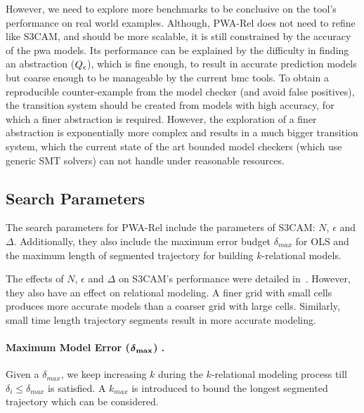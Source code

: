 However, we need to explore more benchmarks to be conclusive on the
tool's performance on real world examples. Although, PWA-Rel does not
need to refine like S3CAM, and should be more scalable, it is still
constrained by the accuracy of the pwa models. Its performance can be
explained by the difficulty in finding an abstraction
($Q_\epsilon$), which is fine enough, to result in accurate
prediction models but coarse enough to be manageable by the current
bmc tools.  To obtain a reproducible counter-example from the model
checker (and avoid false positives), the transition system should be
created from models with high accuracy, for which a finer abstraction
is required.  However, the exploration of a finer abstraction is
exponentially more complex and results in a much bigger transition
system, which the current state of the art bounded model checkers
(which use generic SMT solvers) can not handle under reasonable
resources.

\subsection{Search Parameters}

The search parameters for PWA-Rel include the parameters of S3CAM:
$N$, $\epsilon$ and $\Delta$. Additionally, they also include the
maximum error budget $\delta_{max}$ for OLS and the maximum length of
segmented trajectory for building $k$-relational models.

The effects of $N$, $\epsilon$ and $\Delta$
on S3CAM's performance were detailed in~\cite{zutshi2014multiple}. However, they also have an effect on
relational modeling. A finer grid with small cells produces more
accurate models than a coarser grid with large cells. Similarly,
small time length trajectory segments result in more accurate
modeling.

\paragraph{Maximum Model Error ($\boldsymbol{\delta}_{\bold{max}}$) .}
Given a $\delta_{max}$, we keep increasing $k$ during the
$k$-relational modeling process till $\delta_i \le \delta_{max}$ is
satisfied. A $k_{max}$ is introduced to bound the longest
segmented trajectory which can be considered.


